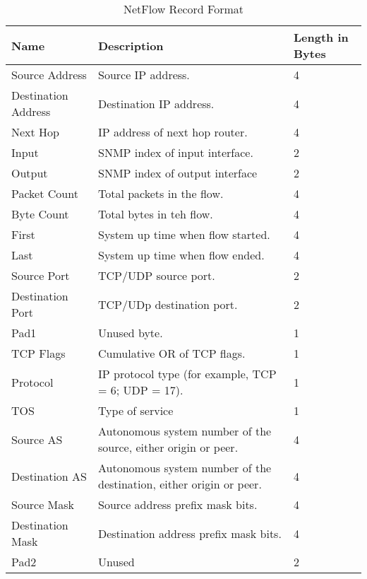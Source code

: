     \begin{table}
     \begin{tabular}{|p{4cm}|p{9cm}|p{2cm}|}
      \hline
      {\bf Name} & {\bf Description} & {\bf Length in Bytes} \\ \hline
      Source Address & Source IP address. & 4 \\ \hline
      Destination Address & Destination IP address. & 4 \\ \hline
      Next Hop & IP address of next hop router. & 4 \\ \hline
      Input & SNMP index of input interface. & 2 \\ \hline
      Output & SNMP index of output interface & 2 \\ \hline
      Packet Count & Total packets in the flow. & 4 \\ \hline
      Byte Count & Total bytes in teh flow. & 4 \\ \hline
      First & System up time when flow started. & 4 \\ \hline
      Last  & System up time when flow ended. & 4 \\ \hline
      Source Port & TCP/UDP source port. & 2 \\ \hline
      Destination Port & TCP/UDp destination port. & 2 \\ \hline
      Pad1 & Unused byte. & 1 \\ \hline
      TCP Flags & Cumulative OR of TCP flags. & 1 \\ \hline
      Protocol &  IP protocol type (for example, TCP = 6; UDP = 17). & 1 \\ \hline
      TOS & Type of service & 1 \\ \hline
      Source AS & Autonomous system number of the source, either origin or peer. & 4 \\ \hline
      Destination AS & Autonomous system number of the destination, either origin or peer. & 4 \\ \hline
      Source Mask & Source address prefix mask bits. & 4 \\ \hline
      Destination Mask & Destination address prefix mask bits. & 4 \\ \hline
      Pad2 & Unused & 2 \\ \hline
      \end{tabular}
     \label{netflowrecord}
     \caption{NetFlow Record Format}
    \end{table}


    
